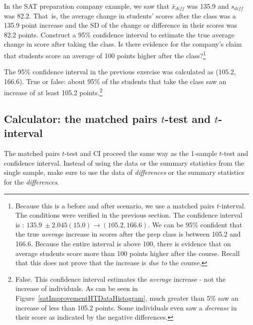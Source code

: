 \begin{exercise}In the SAT preparation company example, we saw that $\bar{x}_{diff}$ was 135.9 and $s_{diff}$ was 82.2. That~is, the average change in students' scores after the class was a 135.9 point increase and the SD of the change or difference in their scores was 82.2 points. Construct a 95\% confidence interval to estimate the true average change in score after taking the class. Is there evidence for the company's claim that students score an average of 100 points higher after the class?\footnote{Because this is a before and after scenario, we use a matched pairs $t$-interval. The conditions were verified in the previous section. The confidence interval is : $135.9\ \pm 2.045(15.0) \to (105.2, 166.6)$. We can be 95\% confident that the true \emph{average} increase in scores after the prep class is between 105.2 and 166.6. Because the entire interval is above 100, there is evidence that on average students score more than 100 points higher after the course. Recall that this does not prove that the increase is \emph{due to}  the course.}
\end{exercise}

\textA{\newpage}

\begin{exercise}The 95\% confidence interval in the previous exercise was calculated as (105.2, 166.6). True or false: about 95\% of the students that take the class saw an increase of at least 105.2 points.\footnote{False. This confidence interval estimates the \emph{average} increase - not the increase of individuals. As can be seen in Figure~\ref{satImprovementHTDataHistogram}, much greater than 5\% saw an increase of less than 105.2 points. Some individuals even saw a \emph{decrease} in their score as indicated by the negative differences.}
\end{exercise}


\subsection{Calculator: the matched pairs $t$-test and $t$-interval}

The matched pairs $t$-test and CI proceed the same way as the 1-sample $t$-test and confidence interval. Instead of using the data or the summary statistics from the single sample, make sure to use the data of \emph{differences} or the summary statistics for the \emph{differences}.

